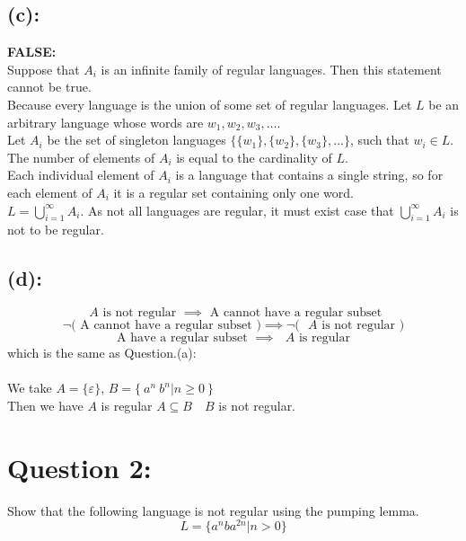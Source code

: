 \documentclass [9 pt]{article}
\theoremstyle{definition}
\begin{document}
\subsection*{(c):}
\textbf{FALSE:} \\
\newline
Suppose that $A_i$ is an infinite family of regular languages. Then this statement cannot be true.\\
 Because every language is the union of some set of regular languages. Let $L$ be an arbitrary language whose words are $w_1, w_2, w_3, \ldots $. \\
 Let $A_i$ be the set of singleton languages $\{ \{w_1\}, \{w_2\}, \{w_3\}, \ldots  \}$, such that $w_i \in L$. The number of elements of $A_i$ is equal to the cardinality of $L$.\\
  Each individual element of $A_i$ is a language that contains a single string, so for each element of $A_i$ it is a regular set containing only one word.\\
   $L = \bigcup_{i = 1}^{\infty}A_i$. As not all languages are regular, it must exist  case that $\bigcup_{i = 1}^{\infty}A_i$ is not to be regular. 
\subsection*{(d):}

$$\text{ $A$ is not regular } \implies \text{ A cannot have a regular subset } $$
$$ \neg \bigg(\text{ A cannot have a regular subset } \bigg)  \implies \neg \bigg( \text{ $A$ is not regular } \bigg) $$
$$ \text{ A  have a regular subset }  \implies\text{ $A$ is regular } $$
which is the same as Question.(a):\\
\\
We take $A = \{ \varepsilon \}$, $B = \{\  a^n \ b^n | n \geq 0\  \}$\\
\newline
Then we have $A$ is regular \quad $A \subseteq B \quad B $ is not regular.























\newpage
\section*{Question 2:}
Show that the following language is not regular using the pumping lemma. 
$$ L = \{a^n b a^{2n}|n > 0 \}$$
\\
\newline\newline
\end{document}
